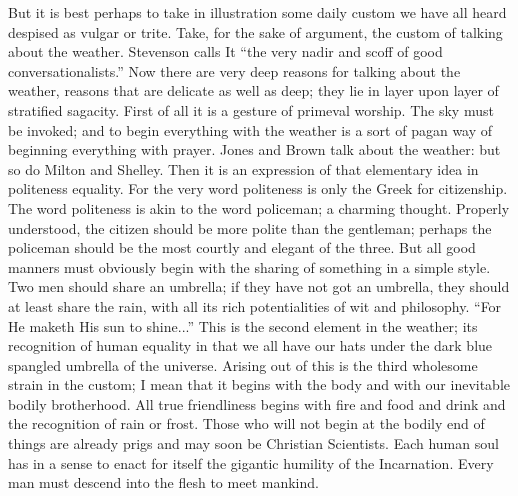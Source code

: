 \documentclass{book}
\begin{document}
But it is best perhaps to take in illustration some daily custom we have all heard despised as vulgar or trite. Take, for the sake of argument, the custom of talking about the weather. Stevenson calls It “the very nadir and scoff of good conversationalists.” Now there are very deep reasons for talking about the weather, reasons that are delicate as well as deep; they lie in layer upon layer of stratified sagacity. First of all it is a gesture of primeval worship. The sky must be invoked; and to begin everything with the weather is a sort of pagan way of beginning everything with prayer. Jones and Brown talk about the weather: but so do Milton and Shelley. Then it is an expression of that elementary idea in politeness equality. For the very word politeness is only the Greek for citizenship. The word politeness is akin to the word policeman; a charming thought. Properly understood, the citizen should be more polite than the gentleman; perhaps the policeman should be the most courtly and elegant of the three. But all good manners must obviously begin with the sharing of something in a simple style. Two men should share an umbrella; if they have not got an umbrella, they should at least share the rain, with all its rich potentialities of wit and philosophy. “For He maketh His sun to shine...” This is the second element in the weather; its recognition of human equality in that we all have our hats under the dark blue spangled umbrella of the universe. Arising out of this is the third wholesome strain in the custom; I mean that it begins with the body and with our inevitable bodily brotherhood. All true friendliness begins with fire and food and drink and the recognition of rain or frost. Those who will not begin at the bodily end of things are already prigs and may soon be Christian Scientists. Each human soul has in a sense to enact for itself the gigantic humility of the Incarnation. Every man must descend into the flesh to meet mankind.
\end{document}
